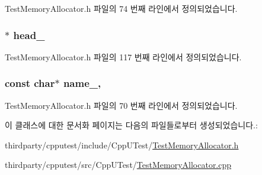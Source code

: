 Test\+Memory\+Allocator.\+h 파일의 74 번째 라인에서 정의되었습니다.

\subsubsection[{\texorpdfstring{head\+\_\+}{head_}}]{$\ast$ head\+\_\+\hspace{0.3cm}{\ttfamily [protected]}}\hypertarget{class_failable_memory_allocator_abca7541fbe80c2313fd718d9f1244c42}{}\label{class_failable_memory_allocator_abca7541fbe80c2313fd718d9f1244c42}


Test\+Memory\+Allocator.\+h 파일의 117 번째 라인에서 정의되었습니다.

\subsubsection[{\texorpdfstring{name\+\_\+}{name_}}]{\setlength{\rightskip}{0pt plus 5cm}const char$\ast$ name\+\_\+\hspace{0.3cm}{\ttfamily [protected]}, {\ttfamily [inherited]}}\hypertarget{class_test_memory_allocator_a7dac8366c11fbcad2f49d85fe8fc4fbe}{}\label{class_test_memory_allocator_a7dac8366c11fbcad2f49d85fe8fc4fbe}


Test\+Memory\+Allocator.\+h 파일의 70 번째 라인에서 정의되었습니다.



이 클래스에 대한 문서화 페이지는 다음의 파일들로부터 생성되었습니다.\+:\begin{DoxyCompactItemize}
\item 
thirdparty/cpputest/include/\+Cpp\+U\+Test/\hyperlink{_test_memory_allocator_8h}{Test\+Memory\+Allocator.\+h}\item 
thirdparty/cpputest/src/\+Cpp\+U\+Test/\hyperlink{_test_memory_allocator_8cpp}{Test\+Memory\+Allocator.\+cpp}\end{DoxyCompactItemize}
